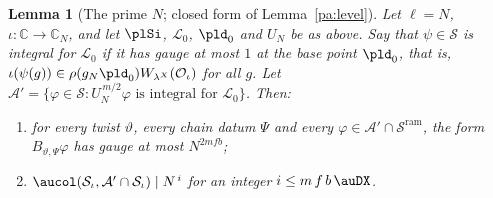 \documentclass[10pt]{amsart}
\newtheorem{lemma}[theorem]{Lemma}
\theoremstyle{definition}
\theoremstyle{remark}
\newcommand{\C}{\mathbb C}
\providecommand{\auO}{\mathcal O}
\providecommand{\auS}{\mathcal S}
\providecommand{\auSram}{\mathcal S^{\mathrm{ram}}}
\begin{document}
\begin{lemma}[The prime $N$; closed form of Lemma~\ref{pa:level}]\label{pl:level}
Let $\ell=N$, $\iota\colon\C\to\C_N$, and let $\plSi$, $\mathcal L_0$, $\pld_0$ and $U_N$ be as above. Say
that $\psi\in\auS$ is \emph{integral for $\mathcal L_0$} if it has gauge at most $1$ at the base point
$\pld_0$, that is, $\iota(\psi(g))\in\rho(g_N\pld_0)W_{\lambda^X}(\auO_\iota)$ for all $g$. Let
$\mathcal A'=\{\varphi\in\auS:U_N^{\,m/2}\varphi\text{ is integral for }\mathcal L_0\}$. Then:
\begin{enumerate}
\item[(a)] for every twist $\vartheta$, every chain datum $\Psi$
and every $\varphi\in\mathcal A'\cap\auSram$, the form $B_{\vartheta,\Psi}\varphi$ has gauge at
most $N^{2mfb}$;
\item[(b)] $\aucol(\auS_\iota,\mathcal A'\cap\auS_\iota)\mid N^{\,i}$ for an integer $i\le
m\,f\,b\,\auDX$.
\end{enumerate}
\end{lemma}
\end{document}
